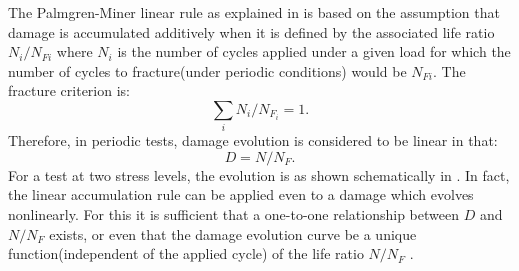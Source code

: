The Palmgren-Miner linear rule as explained in \cite{lemaitre1990mechanics} is based on the assumption that damage is accumulated additively when it is defined by the associated life ratio $N_i/N_{Fi}$ where $N_i$ is the number of cycles applied under a given load for which the number of cycles to fracture(under periodic conditions) would be $N_{Fi}$. The fracture criterion is:
$$\sum_{i}N_i/N_{F_i}=1.$$
Therefore, in periodic tests, damage evolution is considered to be linear in that:
$$D=N/N_F.$$
For a test at two stress levels, the evolution is as shown schematically in . In fact, the linear accumulation rule can be applied even to a damage which evolves nonlinearly. For this it is sufficient that a one-to-one relationship between $D$ and $N/N_F$ exists, or even that the damage evolution curve be a unique function(independent of the applied cycle) of the life ratio $N/N_F$ . 

